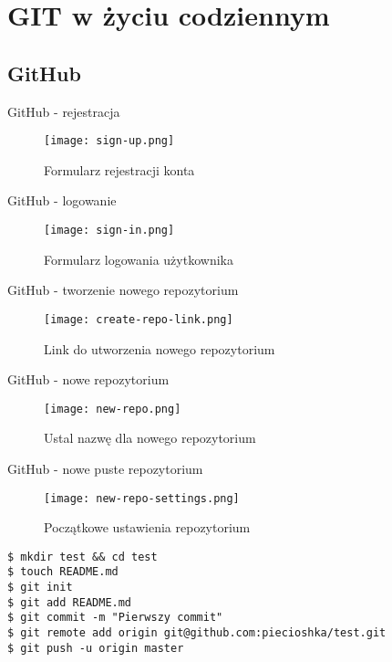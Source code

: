 \documentclass{beamer}
\begin{document}

\section{GIT w życiu codziennym}

\subsection{GitHub}

\begin{frame}{GitHub - rejestracja}
	\begin{figure}
	\texttt{[image: sign-up.png]}
	\caption{\label{fig:sign-up}Formularz rejestracji konta}
	\end{figure}
\end{frame}

\begin{frame}{GitHub - logowanie}
	\begin{figure}
	\texttt{[image: sign-in.png]}
	\caption{\label{fig:sign-in}Formularz logowania użytkownika}
	\end{figure}
\end{frame}

\begin{frame}{GitHub - tworzenie nowego repozytorium}
	\begin{figure}
	\texttt{[image: create-repo-link.png]}
	\caption{\label{fig:create-repo-link}Link do utworzenia nowego repozytorium}
	\end{figure}
\end{frame}

\begin{frame}{GitHub - nowe repozytorium}
	\begin{figure}
	\texttt{[image: new-repo.png]}
	\caption{\label{fig:new-repo}Ustal nazwę dla nowego repozytorium}
	\end{figure}
\end{frame}

\begin{frame}{GitHub - nowe puste repozytorium}
	\begin{figure}
	\texttt{[image: new-repo-settings.png]}
	\caption{\label{fig:new-repo-settings}Początkowe ustawienia repozytorium}
	\end{figure}
\end{frame}

\begin{framed}
\begin{lstlisting}[frame=none, caption=Pierwszy projekt]
$ mkdir test && cd test
$ touch README.md
$ git init
$ git add README.md
$ git commit -m "Pierwszy commit"
$ git remote add origin git@github.com:piecioshka/test.git
$ git push -u origin master
\end{lstlisting}
\end{framed}
\end{document}
